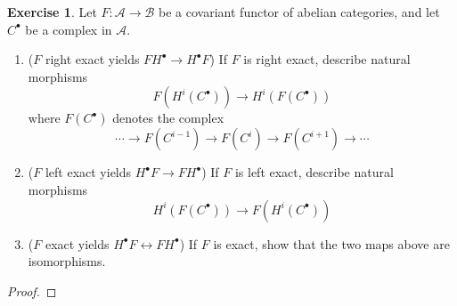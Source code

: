 \documentclass[psamsfonts]{amsart}
\theoremstyle{definition}
\newtheorem{exer}[thm]{Exercise}
\theoremstyle{remark}
\begin{document}
\begin{exer}
Let $F: \mathscr{A} \to \mathscr{B}$ be a covariant functor of abelian categories, and let $C^\bullet$ be a complex in $\mathscr{A}$.
\begin{enumerate}
\item ($F$ right exact yields $FH^\bullet \to H^\bullet F$) If $F$ is right exact, describe natural morphisms 
$$F(H^i(C^\bullet)) \to H^i(F(C^\bullet))$$
where $F(C^\bullet)$ denotes the complex
$$\cdots \to F(C^{i-1}) \to F(C^i) \to F(C^{i+1}) \to \cdots $$
\item ($F$ left exact yields $H^\bullet F \to FH^\bullet$) If $F$ is left exact, describe natural morphisms
$$H^i(F(C^\bullet)) \to F(H^i(C^\bullet)) $$
\item ($F$ exact yields $H^\bullet F \leftrightarrow FH^\bullet$) If $F$ is exact, show that the two maps above are isomorphisms.
\end{enumerate}
\end{exer}
\begin{proof}

\end{proof}
%
\end{document}
